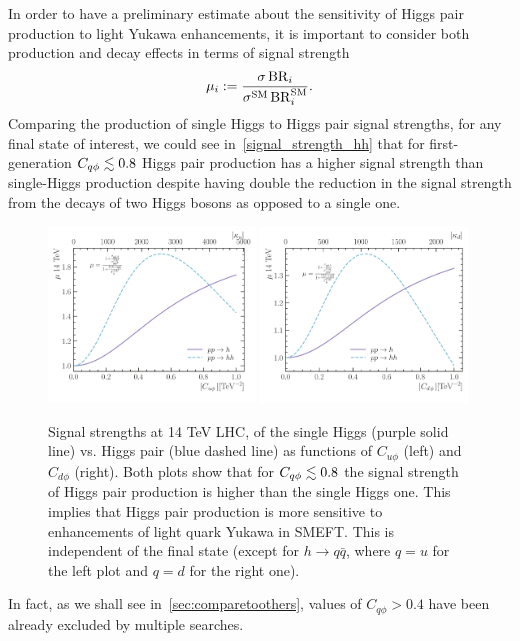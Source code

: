 In order to have a preliminary estimate about the sensitivity of Higgs pair production to light Yukawa enhancements, it is important to consider both production and decay effects in terms of signal strength
\begin{equation}
	\mu_i : = \frac{\sigma \, {\rm BR}_i } {\sigma^{\mathrm{SM}} \, {\rm BR}_i^{\mathrm{SM}}}.
\end{equation}
Comparing the production of single Higgs to Higgs pair signal strengths, for any final state of interest, we could see in~\autoref{signal_strength_hh} that for first-generation $C_{q \phi} \lesssim 0.8$ Higgs pair production has a higher signal strength than single-Higgs production despite having double the reduction in the signal strength from the decays of two Higgs bosons as opposed to a single one. 
\begin{figure}[!t]
	\centering
	\includegraphics[width = 0.49\textwidth]{./figures/up-signal-strength.pdf}
	\includegraphics[width = 0.49\textwidth]{./figures/dn-signal-strength}
	\caption{Signal strengths at 14 TeV LHC, of the single Higgs (purple solid line) vs. Higgs pair (blue dashed line) as functions of $C_{u\phi}$ (left) and $C_{d \phi}$ (right). Both plots show that for $C_{q \phi} \lesssim 0.8$  the signal strength of Higgs pair production is higher than the single Higgs one. This implies that Higgs pair production is more sensitive to enhancements of light quark Yukawa in SMEFT. This is independent of the final state (except for $ h \to q \bar q$, where $q=u$ for the left plot and $q=d$ for the right one).  }
	\label{signal_strength_hh}
\end{figure}
In fact, as we shall see in~\autoref{sec:comparetoothers}, values of $C_{q \phi} >0.4$ have been already excluded by multiple searches. 
